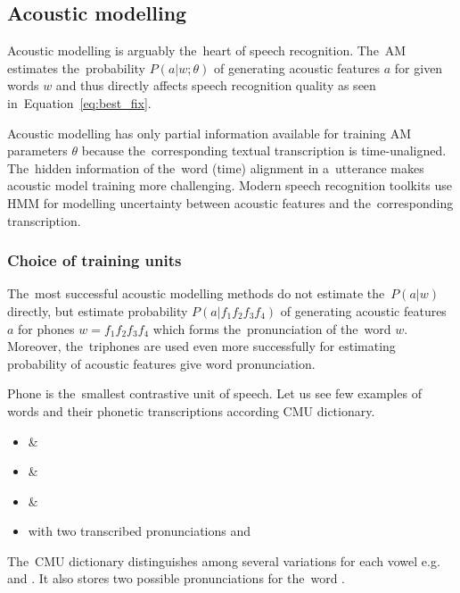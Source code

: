 
\subsection{Acoustic modelling}
\label{sub:am}
Acoustic modelling is arguably the~heart of speech recognition.
The~\ac{AM} estimates the~probability $P(a|w; \theta)$ of generating acoustic features $a$ for given words $w$ and thus directly affects speech recognition quality as seen in~Equation~\ref{eq:best_fix}.

Acoustic modelling has only partial information available for training \ac{AM} parameters $\theta$ because the~corresponding textual transcription is time-unaligned.
The~hidden information of the~word (time) alignment in a~utterance makes acoustic model training more challenging.
Modern speech recognition toolkits use \acl{HMM} for modelling uncertainty between acoustic features and the~corresponding transcription. 

\subsubsection*{Choice of training units}
The~most successful acoustic modelling methods do not estimate the~$P(a|w)$ directly, but estimate probability $P(a|f_1f_2f_3f_4)$ of generating acoustic features $a$ for phones $w=f_1f_2f_3f_4$ which forms the~pronunciation of the~word $w$. Moreover, the~triphones are used even more successfully for estimating probability of acoustic features give word pronunciation.

Phone is the~smallest contrastive unit of speech. 
Let us see few examples of words and their phonetic transcriptions according CMU dictionary\cite{weide1998cmu}.
\begin{itemize}
    \item {} \& 
    \item {} \& 
    \item {} \& 
    \item {} with two transcribed pronunciations  and 
\end{itemize}
The~CMU dictionary distinguishes among several variations for each vowel e.g.  and .
It also stores two possible pronunciations for the~word .

